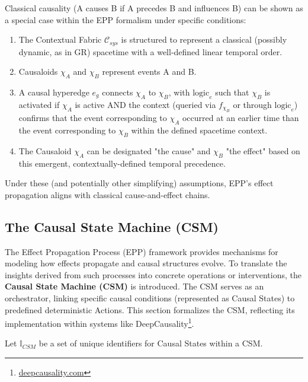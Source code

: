         Classical causality (A causes B if A precedes B and influences B) can be shown as a special case within the EPP formalism under specific conditions:
        \begin{enumerate}
            \item The Contextual Fabric \(\mathcal{C}_{sys}\) is structured to represent a classical (possibly dynamic, as in GR) spacetime with a well-defined linear temporal order.
            \item Causaloids \(\chi_A\) and \(\chi_B\) represent events A and B.
            \item A causal hyperedge \(e_g\) connects \(\chi_A\) to \(\chi_B\), with \(\text{logic}_e\) such that \(\chi_B\) is activated if \(\chi_A\) is active AND the context (queried via \(f_{\chi_B}\) or through \(\text{logic}_e\)) confirms that the event corresponding to \(\chi_A\) occurred at an earlier time than the event corresponding to \(\chi_B\) within the defined spacetime context.
            \item The Causaloid \(\chi_A\) can be designated "the cause" and \(\chi_B\) "the effect" based on this emergent, contextually-defined temporal precedence.
        \end{enumerate}
        Under these (and potentially other simplifying) assumptions, EPP's effect propagation aligns with classical cause-and-effect chains.


\subsection[The Causal State Machine (CSM) ]{The Causal State Machine (CSM)}
\label{sec:formalization_csm}

The Effect Propagation Process (EPP) framework provides mechanisms for modeling how effects propagate and causal structures evolve. To translate the insights derived from such processes into concrete operations or interventions, the \textbf{Causal State Machine (CSM)} is introduced. The CSM serves as an orchestrator, linking specific causal conditions (represented as Causal States) to predefined deterministic Actions. This section formalizes the CSM, reflecting its implementation within systems like DeepCausality\footnote{\url{deepcausality.com}}.

Let \(\mathbb{I}_{CSM}\) be a set of unique identifiers for Causal States within a CSM.

